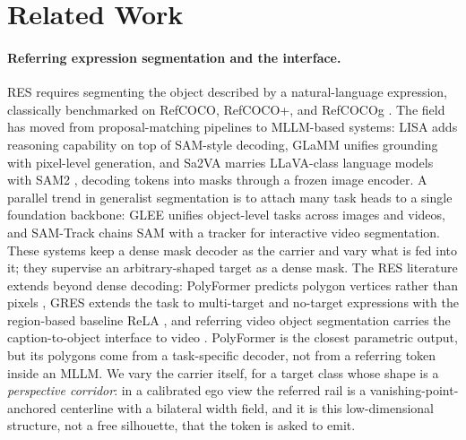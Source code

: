 \section{Related Work}
\label{sec:related}

\paragraph{Referring expression segmentation and the \Seg{} interface.}
RES requires segmenting the object described by a natural-language expression, classically benchmarked on RefCOCO, RefCOCO+, and RefCOCOg \citep{yu2016refcoco,mao2016refcocog}.
The field has moved from proposal-matching pipelines to MLLM-based systems: LISA \citep{lai2024lisa} adds reasoning capability on top of SAM-style decoding, GLaMM \citep{rasheed2024glamm} unifies grounding with pixel-level generation, and Sa2VA \citep{zhang2025sa2va} marries LLaVA-class language models with SAM2 \citep{ravi2024sam2}, decoding \Seg{} tokens into masks through a frozen image encoder.
A parallel trend in generalist segmentation is to attach many task heads to a single foundation backbone: GLEE \citep{wu2024glee} unifies object-level tasks across images and videos, and SAM-Track \citep{cheng2023samtrack} chains SAM with a tracker for interactive video segmentation.
These systems keep a dense mask decoder as the carrier and vary what is fed into it; they supervise an arbitrary-shaped target as a dense mask.
The RES literature extends beyond dense decoding: PolyFormer predicts polygon vertices rather than pixels \citep{liu2023polyformer}, GRES extends the task to multi-target and no-target expressions with the region-based baseline ReLA \citep{liu2023gres}, and referring video object segmentation carries the caption-to-object interface to video \citep{miao2024htr}. PolyFormer is the closest parametric output, but its polygons come from a task-specific decoder, not from a referring token inside an MLLM.
We vary the carrier itself, for a target class whose shape is a \emph{perspective corridor}: in a calibrated ego view the referred rail is a vanishing-point-anchored centerline with a bilateral width field, and it is this low-dimensional structure, not a free silhouette, that the token is asked to emit.

